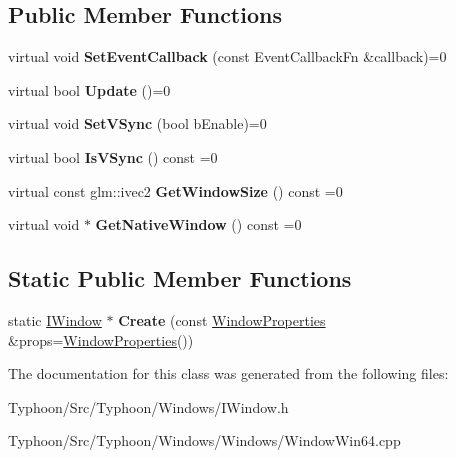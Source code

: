 \subsection*{Public Member Functions}
\begin{DoxyCompactItemize}
\item 
\mbox{\label{class_typhoon_engine_1_1_i_window_a428e0f9aa56ca0c6f3dbed0153bff710}} 
virtual void {\bfseries Set\+Event\+Callback} (const Event\+Callback\+Fn \&callback)=0
\item 
\mbox{\label{class_typhoon_engine_1_1_i_window_a7c24726e8cbb0b126d3b0e4550fc9a71}} 
virtual bool {\bfseries Update} ()=0
\item 
\mbox{\label{class_typhoon_engine_1_1_i_window_a0e6186e1ec0d6781ffe607bdff619a1f}} 
virtual void {\bfseries Set\+V\+Sync} (bool b\+Enable)=0
\item 
\mbox{\label{class_typhoon_engine_1_1_i_window_a0b0dab55e2e9b9a04bcd51635957f6be}} 
virtual bool {\bfseries Is\+V\+Sync} () const =0
\item 
\mbox{\label{class_typhoon_engine_1_1_i_window_a989e4a4c5b78af998d350946a12e999c}} 
virtual const glm\+::ivec2 {\bfseries Get\+Window\+Size} () const =0
\item 
\mbox{\label{class_typhoon_engine_1_1_i_window_ada34715b7155187a6c45788a267fc3aa}} 
virtual void $\ast$ {\bfseries Get\+Native\+Window} () const =0
\end{DoxyCompactItemize}
\subsection*{Static Public Member Functions}
\begin{DoxyCompactItemize}
\item 
\mbox{\label{class_typhoon_engine_1_1_i_window_a9399e26d56f26390fbf96062cdfc1181}} 
static \mbox{\hyperlink{class_typhoon_engine_1_1_i_window}{I\+Window}} $\ast$ {\bfseries Create} (const \mbox{\hyperlink{struct_typhoon_engine_1_1_window_properties}{Window\+Properties}} \&props=\mbox{\hyperlink{struct_typhoon_engine_1_1_window_properties}{Window\+Properties}}())
\end{DoxyCompactItemize}


The documentation for this class was generated from the following files\+:\begin{DoxyCompactItemize}
\item 
Typhoon/\+Src/\+Typhoon/\+Windows/I\+Window.\+h\item 
Typhoon/\+Src/\+Typhoon/\+Windows/\+Windows/Window\+Win64.\+cpp\end{DoxyCompactItemize}
